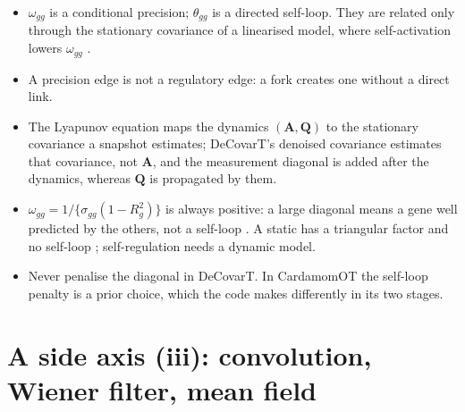 \documentclass[11pt,a4paper]{article}
\begin{document}
\begin{answerbox}[title=In short: diagonal]
\begin{itemize}
  \item $\omega_{gg}$ is a conditional precision; $\theta_{gg}$ is a directed self-loop. They are related
        only through the stationary covariance of a linearised model, where self-activation lowers
        $\omega_{gg}$ .
  \item A precision edge is not a regulatory edge: a fork creates one without a direct link.
  \item The Lyapunov equation maps the dynamics $(\bm A,\bm Q)$ to the stationary covariance a snapshot
        estimates; DeCovarT's denoised covariance estimates that covariance, not $\bm A$, and the measurement
        diagonal is added after the dynamics, whereas $\bm Q$ is propagated by them.
  \item $\omega_{gg}=1/\{\sigma_{gg}(1-R^2_g)\}$ is always positive: a large diagonal means a gene well
        predicted by the others, not a self-loop . A static  has a triangular factor
        and no self-loop ; self-regulation needs a dynamic model.
  \item Never penalise the  diagonal in DeCovarT. In CardamomOT the self-loop penalty is
        a prior choice, which the code makes differently in its two stages.
\end{itemize}
\end{answerbox}

\section{A side axis (iii): convolution, Wiener filter, mean field}\label{sec:side}
\end{document}
